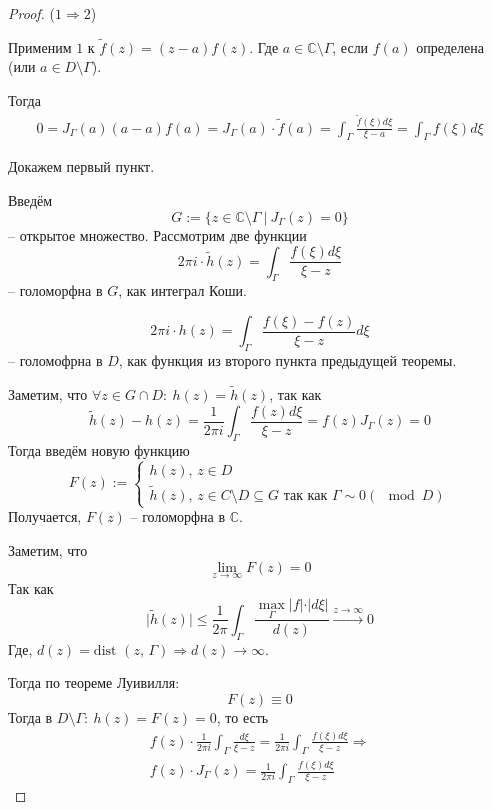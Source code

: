\documentclass[a4paper,12pt]{article}
\renewcommand{\leq}{\ensuremath{\leqslant}}
\theoremstyle{plain}
\theoremstyle{definition}
\theoremstyle{remark}
\begin{document}
\begin{proof}
	($1 \Rightarrow 2$)

	Применим $1$ к $\tilde{f}(z) = (z - a)f(z)$. Где $a \in \mathbb{C} \setminus \Gamma$, если $f(a)$ определена (или $a \in D \setminus \Gamma$).

	Тогда
	\begin{align*}
		0 = J_\Gamma(a)(a - a)f(a) = J_\Gamma(a)\cdot\tilde{f}(a) = \int_\Gamma\frac{\tilde{f}(\xi)d\xi}{\xi - a} = \int_\Gamma f(\xi)d\xi
	\end{align*}

	Докажем первый пункт.

	Введём
	\[
		G := \{z \in \mathbb{C} \setminus \Gamma \:\vert\: J_\Gamma(z) = 0\}
	\]
	-- открытое множество. Рассмотрим две функции
	\[
		2\pi i \cdot\tilde{h}(z) = \int_\Gamma\frac{f(\xi)d\xi}{\xi - z}
	\]
	-- голоморфна в $G$, как интеграл Коши.

	\[
		2\pi i\cdot h(z) = \int_\Gamma\frac{f(\xi) - f(z)}{\xi - z}d\xi
	\]
	-- голомофрна в $D$, как функция из второго пункта предыдущей теоремы.

	Заметим, что $\forall z \in G \cap D :\: h(z) = \tilde{h}(z)$, так как
	\[
		\tilde{h}(z) - h(z) = \frac{1}{2\pi i}\int_\Gamma \frac{f(z)d\xi}{\xi - z} = f(z)J_\Gamma(z) = 0
	\]
	Тогда введём новую функцию
	\[
		F(z) := \begin{cases}
			h(z),\, z \in D \\
			\tilde{h}(z),\, z \in C\setminus D \subseteq G \text{ так как } \Gamma \sim 0 (\mod D)
		\end{cases}
	\]
	Получается, $F(z)$ -- голоморфна в $\mathbb{C}$.

	Заметим, что
	\[
		\lim_{z \to \infty} F(z) = 0
	\]
	Так как
	\[
		\vert\tilde{h}(z)\vert \leq \frac{1}{2\pi}\int_\Gamma\frac{\max_\Gamma \vert f\vert\cdot\vert d\xi\vert}{d(z)} \overset{z \to \infty}{\to} 0
	\]
	Где, $d(z) = \text{dist }(z,\, \Gamma) \Rightarrow d(z) \to \infty$.

	Тогда по теореме Луивилля:
	\[
		F(z) \equiv 0
	\]
	Тогда в $D \setminus \Gamma :\: h(z) = F(z) = 0$, то есть
	\begin{align*}
		f(z)\cdot\frac{1}{2\pi i}\int_{\Gamma}\frac{d\xi}{\xi - z} = \frac{1}{2\pi i}\int_\Gamma\frac{f(\xi)d\xi}{\xi - z} \Rightarrow \\
		f(z)\cdot J_\Gamma(z) =  \frac{1}{2\pi i}\int_\Gamma\frac{f(\xi)d\xi}{\xi - z}
	\end{align*}
\end{proof}
\end{document}
